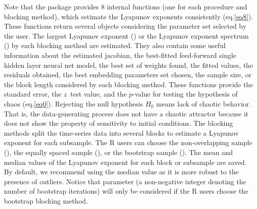 Note that the  package provides 8 internal functions (one for each procedure and blocking method), which estimate the Lyapunov exponents consistently (eq.\ref{eq8}). These functions return several objects considering the parameter set selected by the user. The largest Lyapunov exponent () or the Lyapunov exponent spectrum () by each blocking method are estimated. They also contain some useful information about the estimated jacobian, the best-fitted feed-forward single hidden layer neural net model, the best set of weights found, the fitted values, the residuals obtained, the best embedding parameters set chosen, the sample size, or the block length considered by each blocking method. These functions provide the standard error, the $z$~test value, and the $p$-value for testing the hypothesis of chaos (eq.\ref{eq0}). Rejecting the null hypothesis $H_0$ means lack of chaotic behavior. That is, the data-generating process does not have a chaotic attractor because it does not show the property of sensitivity to initial conditions. The blocking methods split the time-series data into several blocks to estimate a Lyapunov exponent for each subsample. The R users can choose the non-overlapping sample (), the equally spaced sample (), or the bootstrap sample (). The mean and median values of the Lyapunov exponent for each block or subsample are saved. By default, we recommend using the median value as it is more robust to the presence of outliers. Notice that parameter  (a non-negative integer denoting the number of bootstrap iterations) will only be considered if the R users choose the bootstrap blocking method.

